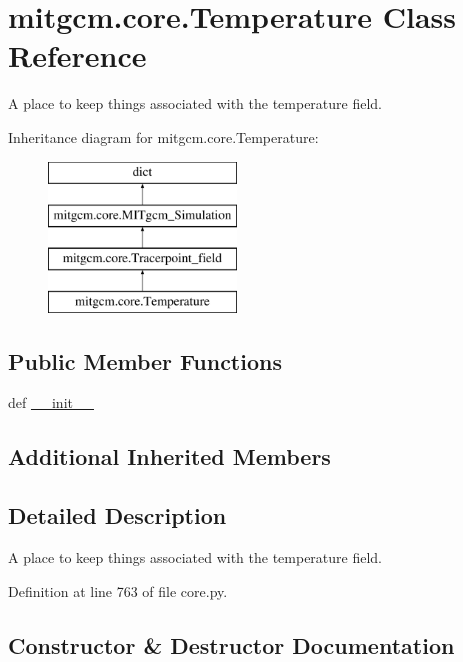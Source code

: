 \hypertarget{classmitgcm_1_1core_1_1Temperature}{}\section{mitgcm.\+core.\+Temperature Class Reference}
\label{classmitgcm_1_1core_1_1Temperature}


A place to keep things associated with the temperature field.  


Inheritance diagram for mitgcm.\+core.\+Temperature\+:\begin{figure}[H]
\begin{center}
\leavevmode
\includegraphics[height=4.000000cm]{classmitgcm_1_1core_1_1Temperature}
\end{center}
\end{figure}
\subsection*{Public Member Functions}
\begin{DoxyCompactItemize}
\item 
def \hyperlink{classmitgcm_1_1core_1_1Temperature_afd2f12d54ed18890fe7117d24c9c3da7}{\+\_\+\+\_\+init\+\_\+\+\_\+}
\end{DoxyCompactItemize}
\subsection*{Additional Inherited Members}


\subsection{Detailed Description}
A place to keep things associated with the temperature field. 



Definition at line 763 of file core.\+py.



\subsection{Constructor \& Destructor Documentation}
\hypertarget{classmitgcm_1_1core_1_1Temperature_afd2f12d54ed18890fe7117d24c9c3da7}{}
